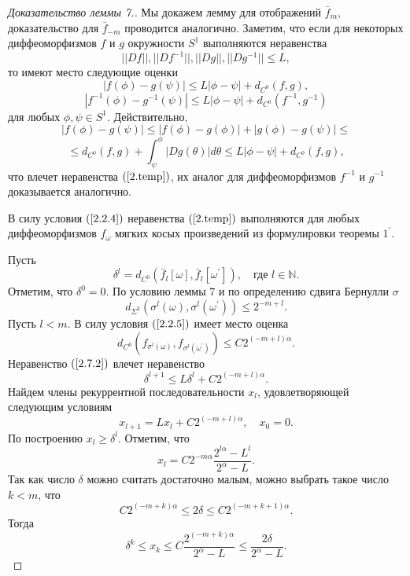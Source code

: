 \documentclass[12pt]{article}
\begin{document}
\begin{proof}[Доказательство леммы 7.] Мы докажем лемму для отображений $\bar{f}_m$, доказательство для $\bar{f}_{-m}$ проводится аналогично.
Заметим, что если для некоторых диффеоморфизмов $f$ и $g$ окружности $S^1$ выполняются неравенства
\begin{equation}
\label{2.temp}
||Df||,||Df^{-1}||,||Dg||,||Dg^{-1}||\leq L,
\end{equation}
то имеют место следующие оценки
\begin{equation}
\label{2.7.2}
|f(\phi)-g(\psi)|\leq L|\phi-\psi|+d_{C^0}(f,g),
\end{equation}
$$|f^{-1}(\phi)-g^{-1}(\psi)|\leq L|\phi-\psi|+d_{C^0}(f^{-1},g^{-1})$$
для любых $\phi,\psi\in S^1$.
Действительно,
$$|f(\phi)-g(\psi)|\leq |f(\phi)-g(\phi)| + |g(\phi)-g(\psi)|\leq$$
$$\leq d_{C^0}(f,g) + \int_{\psi}^{\phi}|Dg(\theta)|d\theta\leq L|\phi-\psi|+d_{C^0}(f,g),$$
что влечет неравенства $(\ref{2.temp})$, их аналог для диффеоморфизмов $f^{-1}$ и $g^{-1}$ доказывается аналогично.

В силу условия $(\ref{2.2.4})$ неравенства $(\ref{2.temp})$ выполняются для любых диффеоморфизмов $f_{\omega}$ мягких косых произведений из формулировки теоремы $1^\prime$.

Пусть
$$\delta^l=d_{C^0}(\bar{f}_l[\omega],\bar{f}_l[\omega^\prime]),\quad\textrm{где }l\in\mathbb{N}.$$
Отметим, что $\delta^0=0$. По условию леммы 7 и по определению сдвига Бернулли $\sigma$
$$d_{\Sigma^2}(\sigma^l(\omega), \sigma^l(\omega^\prime))\leq 2^{-m+l}.$$
Пусть $l<m$.
В силу условия $(\ref{2.2.5})$ имеет место оценка
$$d_{C^0}(f_{\sigma^l(\omega)},f_{\sigma^l(\omega^\prime)})\leq C 2^{(-m+l)\alpha}.$$
Неравенство $(\ref{2.7.2})$ влечет неравенство
$$\delta^{l+1}\leq L\delta^l+C 2^{(-m+l)\alpha}.$$
Найдем члены рекуррентной последовательности $x_l$, удовлетворяющей следующим условиям
$$x_{l+1}=Lx_l+C 2^{(-m+l)\alpha},\quad x_0=0.$$
По построению $x_l\geq\delta^l$. Отметим, что
$$x_l=C 2^{-m\alpha}\frac{2^{l\alpha}-L^l}{2^{\alpha}-L}.$$
Так как число $\delta$ можно считать достаточно малым, можно выбрать такое число $k<m$, что
\begin{equation}
\label{2.7.3}
C 2^{(-m+k)\alpha}\leq 2\delta\leq C 2^{(-m+k+1)\alpha}.
\end{equation}
Тогда
$$\delta^k\leq x_k\leq C\frac{2^{(-m+k)\alpha}}{2^{\alpha}-L}\leq\frac{2\delta}{2^{\alpha}-L}.$$


\end{proof}
\end{document}
